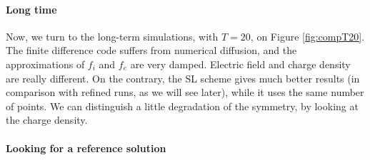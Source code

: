 \documentclass{article}
\numberwithin{equation}{section}
\begin{document}
\paragraph{Long time}

Now, we turn to the long-term simulations, with $T=20$, on Figure \ref{fig:compT20}.  %
%
The finite difference code suffers from numerical diffusion, and the approximations of $f_i$ and $f_e$ are very damped. Electric field and charge density are really different.
On the contrary, the SL scheme gives much better results (in comparison with refined runs, as we will see later), while it uses the same number of points. We can distinguish a little degradation of the symmetry, by looking at the charge density.
%


\paragraph{Looking for a reference solution} %
\end{document}
